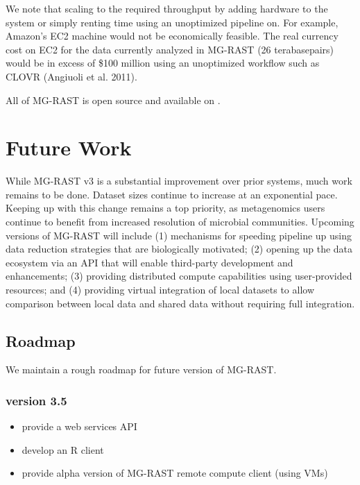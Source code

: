 \documentclass[letterpaper,10pt,english]{sphinxmanual}
\begin{document}
We note that scaling to the required throughput by adding hardware to
the system or simply renting time using an unoptimized pipeline on. For
example, Amazon’s EC2 machine would not be economically feasible. The
real currency cost on EC2 for the data currently analyzed in MG-RAST (26
terabasepairs) would be in excess of \$100 million using an unoptimized
workflow such as CLOVR (Angiuoli et al. 2011).

All of MG-RAST is open source and available on
.


\section{Future Work}
\label{\detokenize{user_manual:future-work}}
While MG-RAST v3 is a substantial improvement over prior systems, much
work remains to be done. Dataset sizes continue to increase at an
exponential pace. Keeping up with this change remains a top priority, as
metagenomics users continue to benefit from increased resolution of
microbial communities. Upcoming versions of MG-RAST will include (1)
mechanisms for speeding pipeline up using data reduction strategies that
are biologically motivated; (2) opening up the data ecosystem via an API
that will enable third-party development and enhancements; (3) providing
distributed compute capabilities using user-provided resources; and (4)
providing virtual integration of local datasets to allow comparison
between local data and shared data without requiring full integration.


\subsection{Roadmap}
\label{\detokenize{user_manual:roadmap}}
We maintain a rough roadmap for future version of MG-RAST.


\subsubsection{version 3.5}
\label{\detokenize{user_manual:version-3-5}}\begin{itemize}
\item {} 
provide a web services API

\item {} 
develop an R client

\item {} 
provide alpha version of MG-RAST remote compute client (using VMs)

\end{itemize}
\end{document}

